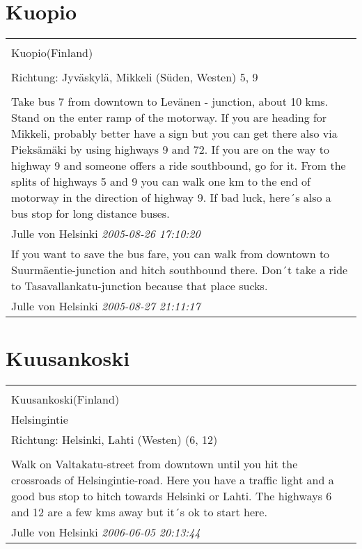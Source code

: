 \documentclass[a4paper,12pt]{article}
\begin{document}
\section{Kuopio}
\begin{tabular}{|p{13cm}|}
\hline\\
Kuopio(Finland)\\
\\
Richtung: Jyväskylä, Mikkeli (Süden, Westen) 5, 9 \\
\hline\\
Take bus 7 from downtown to Levänen -
junction, about 10 kms. Stand on the enter ramp of the motorway. If you are heading for Mikkeli, probably better have a sign but you can get there also via Pieksämäki by using highways 9 and 72. If you are on the way to highway 9 and someone offers a ride southbound, go for it. From the splits of highways 5 and 9 you can walk one km to the end of motorway in the direction of highway 9. If bad luck, here´s also a bus stop for long distance buses. \\
Julle von Helsinki \textit{ 2005-08-26 17:10:20 }\\\hline If you want to save the bus fare, you can walk from downtown to Suurmäentie-junction and hitch southbound there. Don´t take a ride to Tasavallankatu-junction because that place sucks. \\
Julle von Helsinki \textit{ 2005-08-27 21:11:17 }\\\hline
\end{tabular}


\section{Kuusankoski}
\begin{tabular}{|p{13cm}|}
\hline\\
Kuusankoski(Finland)\\
Helsingintie\\
Richtung: Helsinki, Lahti (Westen) (6, 12) \\
\hline\\
Walk on Valtakatu-street from downtown until you hit the crossroads of Helsingintie-road. Here you have a traffic light and a good bus stop to hitch towards Helsinki or Lahti. The highways 6 and 12 are a few kms away but it´s ok to start here. \\
Julle von Helsinki \textit{ 2006-06-05 20:13:44 }\\\hline
\end{tabular}
\end{document}
